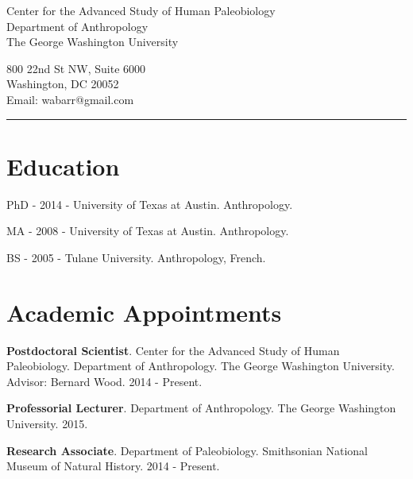 \documentclass{article}
\begin{document}
\begin{center}
\end{center}

\vspace{15pt}

\noindent\begin{minipage}{.60\textwidth}
\begin{flushleft}
Center for the Advanced Study of Human Paleobiology\\
Department of Anthropology\\
The George Washington University\\
\end{flushleft}
\end{minipage}
\begin{minipage}{.395\textwidth}
\begin{flushright}
800 22nd St NW, Suite 6000\\
Washington, DC 20052 \\
Email: wabarr@gmail.com\\
\end{flushright}
\end{minipage}


\noindent\rule[-2mm]{\textwidth}{1pt}

\section*{Education}
\begin{description*}
\item[] PhD - 2014 - University of Texas at Austin. Anthropology.
\item[] MA  - 2008 - University of Texas at Austin. Anthropology.
\item[] BS  - 2005 - Tulane University. Anthropology, French.
\end{description*}


\section*{Academic Appointments}
\begin{description*}
\item[] {\bfseries Postdoctoral Scientist}. Center for the Advanced Study of Human Paleobiology. Department of Anthropology. The George Washington University. Advisor: Bernard Wood. 2014 - Present.
\item[] {\bfseries Professorial Lecturer}. Department of Anthropology. The George Washington University. 2015.
\item[] {\bfseries Research Associate}. Department of Paleobiology.  Smithsonian National Museum of Natural History. 2014 - Present.
\end{description*}
\end{document}
